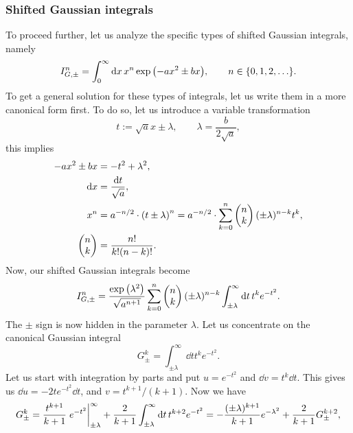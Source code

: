 \documentclass[aps,prl,preprint,groupedaddress,10pt]{revtex4-2}
\begin{document}
\subsubsection{Shifted Gaussian integrals}
To proceed further, let us analyze the specific types of shifted Gaussian integrals,
namely
\begin{equation}
    I_{G,\pm}^n=\int_{0}^{\infty}\dd{x}x^n\exp\pqty{-ax^2\pm bx},
    \qquad n\in\Bqty{0,1,2,\dots}.
\end{equation}
To get a general solution for these types of integrals, let us write them in a
more canonical form first. To do so, let us introduce a variable transformation
\begin{equation}
    t:=\sqrt{a}x\pm\lambda,\qquad\lambda=\frac{b}{2\sqrt{a}},
\end{equation}
this implies
\begin{equation}
    \begin{split}
        -ax^2\pm bx&=-t^2+\lambda^2,\\
        \dd{x}&=\frac{\dd{t}}{\sqrt{a}},\\
        x^n&=a^{-n/2}\cdot\pqty{t\pm\lambda}^n=a^{-n/2}\cdot
        \sum_{k=0}^{n}\pmqty{n\\k}(\pm\lambda)^{n-k}t^k,\\
        \pmqty{n\\k}&=\frac{n!}{k!(n-k)!}.
    \end{split}
\end{equation}
Now, our shifted Gaussian integrals become
\begin{equation}
    I_{G,\pm}^{n}=\frac{\exp\pqty{\lambda^2}}{\sqrt{a^{n+1}}}\sum_{k=0}^{n}\pmqty{n\\k}
    (\pm\lambda)^{n-k}\int_{\pm\lambda}^{\infty}\dd{t}t^ke^{-t^2}.
\end{equation}
The $\pm$ sign is now hidden in the parameter $\lambda$. Let us concentrate on the
canonical Gaussian integral
\begin{equation}
    G^k_{\pm}=\int_{\pm\lambda}^{\infty}\dd{t}t^ke^{-t^2}.
\end{equation}
Let us start with integration by parts and put $u=e^{-t^2}$ and $\dd{v}=t^k\dd{t}$.
This gives us $\dd{u}=-2te^{-t^2}\dd{t}$, and $v=t^{k+1}/(k+1)$. Now we have
\begin{equation}
    G^k_{\pm}=\frac{t^{k+1}}{k+1}\eval{e^{-t^2}}_{\pm\lambda}^{\infty}+
    \frac{2}{k+1}\int_{\pm\lambda}^{\infty}\dd{t}t^{k+2}e^{-t^2}=
    -\frac{(\pm\lambda)^{k+1}}{k+1}e^{-\lambda^2}+\frac{2}{k+1}G^{k+2}_{\pm},
\end{equation}
\end{document}

